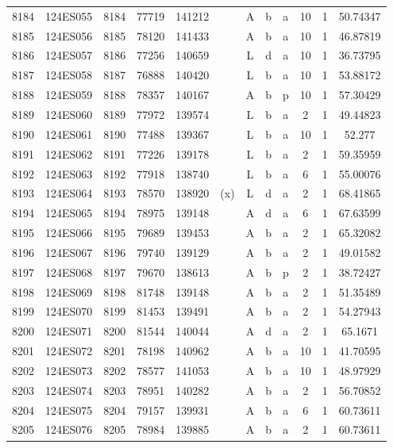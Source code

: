 \begin{tabular}{|*{12}{c|}}
8184 & 124ES055 & 8184 & 77719 & 141212 &  & A & b & a & 10 & 1 & 50.74347 \\ 
8185 & 124ES056 & 8185 & 78120 & 141433 &  & A & b & a & 10 & 1 & 46.87819 \\ 
8186 & 124ES057 & 8186 & 77256 & 140659 &  & L & d & a & 10 & 1 & 36.73795 \\ 
8187 & 124ES058 & 8187 & 76888 & 140420 &  & L & b & a & 10 & 1 & 53.88172 \\ 
8188 & 124ES059 & 8188 & 78357 & 140167 &  & A & b & p & 10 & 1 & 57.30429 \\ 
8189 & 124ES060 & 8189 & 77972 & 139574 &  & L & b & a & 2 & 1 & 49.44823 \\ 
8190 & 124ES061 & 8190 & 77488 & 139367 &  & L & b & a & 10 & 1 & 52.277 \\ 
8191 & 124ES062 & 8191 & 77226 & 139178 &  & L & b & a & 2 & 1 & 59.35959 \\ 
8192 & 124ES063 & 8192 & 77918 & 138740 &  & L & b & a & 6 & 1 & 55.00076 \\ 
8193 & 124ES064 & 8193 & 78570 & 138920 & (x) & L & d & a & 2 & 1 & 68.41865 \\ 
8194 & 124ES065 & 8194 & 78975 & 139148 &  & A & d & a & 6 & 1 & 67.63599 \\ 
8195 & 124ES066 & 8195 & 79689 & 139453 &  & A & b & a & 2 & 1 & 65.32082 \\ 
8196 & 124ES067 & 8196 & 79740 & 139129 &  & A & b & a & 2 & 1 & 49.01582 \\ 
8197 & 124ES068 & 8197 & 79670 & 138613 &  & A & b & p & 2 & 1 & 38.72427 \\ 
8198 & 124ES069 & 8198 & 81748 & 139148 &  & A & b & a & 2 & 1 & 51.35489 \\ 
8199 & 124ES070 & 8199 & 81453 & 139491 &  & A & b & a & 2 & 1 & 54.27943 \\ 
8200 & 124ES071 & 8200 & 81544 & 140044 &  & A & d & a & 2 & 1 & 65.1671 \\ 
8201 & 124ES072 & 8201 & 78198 & 140962 &  & A & b & a & 10 & 1 & 41.70595 \\ 
8202 & 124ES073 & 8202 & 78577 & 141053 &  & A & b & a & 10 & 1 & 48.97929 \\ 
8203 & 124ES074 & 8203 & 78951 & 140282 &  & A & b & a & 2 & 1 & 56.70852 \\ 
8204 & 124ES075 & 8204 & 79157 & 139931 &  & A & b & a & 6 & 1 & 60.73611 \\ 
8205 & 124ES076 & 8205 & 78984 & 139885 &  & A & b & a & 2 & 1 & 60.73611 \\ 

\end{tabular}
